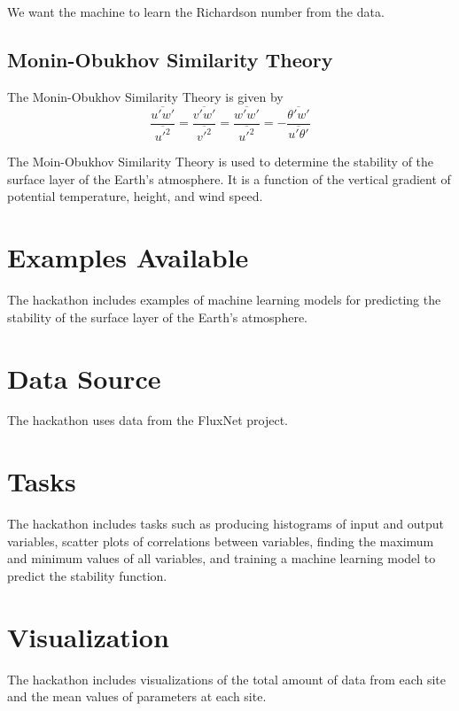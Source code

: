 \documentclass{article}
\begin{document}
We want the machine to learn the Richardson number from the data.

\subsection{Monin-Obukhov Similarity Theory}

The Monin-Obukhov Similarity Theory is given by
\begin{equation}
\frac{\overline{u'w'}}{\overline{u'^2}} = \frac{\overline{v'w'}}{\overline{v'^2}} = \frac{\overline{w'w'}}{\overline{u'^2}} = -\frac{\overline{\theta'w'}}{\overline{u'\theta'}}
\end{equation}

The Moin-Obukhov Similarity Theory is used to determine the stability of the surface layer of the Earth's atmosphere. It is a function of the vertical gradient of potential temperature, height, and wind speed. 

\section{Examples Available}

The hackathon includes examples of machine learning models for predicting the stability of the surface layer of the Earth's atmosphere.

\section{Data Source}

The hackathon uses data from the FluxNet project.

\section{Tasks}

The hackathon includes tasks such as producing histograms of input and output variables, scatter plots of correlations between variables, finding the maximum and minimum values of all variables, and training a machine learning model to predict the stability function.

\section{Visualization}

The hackathon includes visualizations of the total amount of data from each site and the mean values of parameters at each site.
\end{document}
